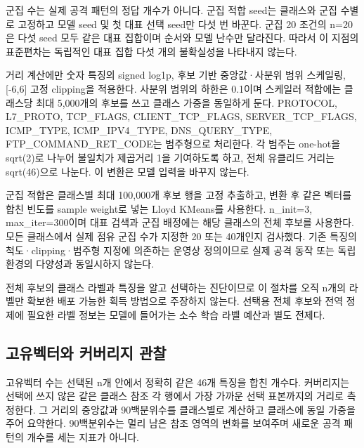군집 수는 실제 공격 패턴의 정답 개수가 아니다. 군집 적합 seed는 클래스와 군집 수별로 고정하고 모델 seed 및 첫 대표 선택 seed만 다섯 번 바꾼다. 군집 20 조건의 n=\allowbreak{}20은 다섯 seed 모두 같은 대표 집합이며 순서와 모델 난수만 달라진다. 따라서 이 지점의 표준편차는 독립적인 대표 집합 다섯 개의 불확실성을 나타내지 않는다.

거리 계산에만 숫자 특징의 signed log1p, 후보 기반 중앙값·사분위 범위 스케일링, [-6,6] 고정 clipping을 적용한다. 사분위 범위의 하한은 0.1이며 스케일러 적합에는 클래스당 최대 5,000개의 후보를 쓰고 클래스 가중을 동일하게 둔다. PROTOCOL, L7\_\allowbreak{}PROTO, TCP\_\allowbreak{}FLAGS, CLIENT\_\allowbreak{}TCP\_\allowbreak{}FLAGS, SERVER\_\allowbreak{}TCP\_\allowbreak{}FLAGS, ICMP\_\allowbreak{}TYPE, ICMP\_\allowbreak{}IPV4\_\allowbreak{}TYPE, DNS\_\allowbreak{}QUERY\_\allowbreak{}TYPE, FTP\_\allowbreak{}COMMAND\_\allowbreak{}RET\_\allowbreak{}CODE는 범주형으로 처리한다. 각 범주는 one-hot을 sqrt(2)로 나누어 불일치가 제곱거리 1을 기여하도록 하고, 전체 유클리드 거리는 sqrt(46)으로 나눈다. 이 변환은 모델 입력을 바꾸지 않는다.

군집 적합은 클래스별 최대 100,000개 후보 행을 고정 추출하고, 변환 후 같은 벡터를 합친 빈도를 sample weight로 넣는 Lloyd KMeans를 사용한다. n\_\allowbreak{}init=\allowbreak{}3, max\_\allowbreak{}iter=\allowbreak{}300이며 대표 검색과 군집 배정에는 해당 클래스의 전체 후보를 사용한다. 모든 클래스에서 실제 점유 군집 수가 지정한 20 또는 40개인지 검사했다. 기존 특징의 척도·clipping·범주형 지정에 의존하는 운영상 정의이므로 실제 공격 동작 또는 독립 환경의 다양성과 동일시하지 않는다.

전체 후보의 클래스 라벨과 특징을 알고 선택하는 진단이므로 이 절차를 오직 n개의 라벨만 확보한 배포 가능한 획득 방법으로 주장하지 않는다. 선택용 전체 후보와 전역 정제에 필요한 라벨 정보는 모델에 들어가는 소수 학습 라벨 예산과 별도 전제다.

\subsection{고유벡터와 커버리지 관찰}
고유벡터 수는 선택된 n개 안에서 정확히 같은 46개 특징을 합친 개수다. 커버리지는 선택에 쓰지 않은 같은 클래스 참조 각 행에서 가장 가까운 선택 표본까지의 거리로 측정한다. 그 거리의 중앙값과 90백분위수를 클래스별로 계산하고 클래스에 동일 가중을 주어 요약한다. 90백분위수는 멀리 남은 참조 영역의 변화를 보여주며 새로운 공격 패턴의 개수를 세는 지표가 아니다.



